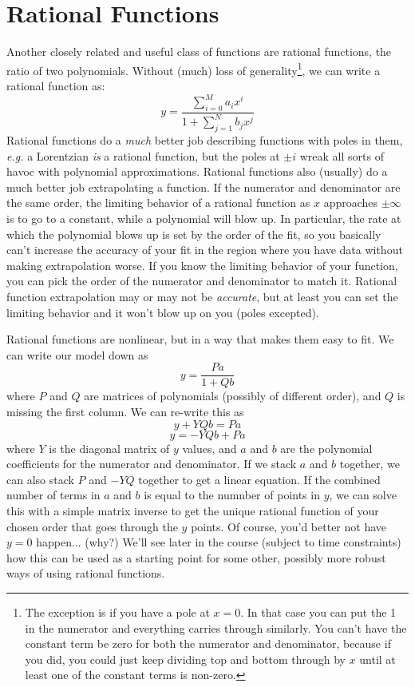 \documentclass[12]{article}
\begin{document}
\section{Rational Functions}
Another closely related and useful class of functions are rational
functions, the ratio of two polynomials.  Without (much) loss of
generality\footnote{The exception is if you have a pole at $x=0$.  In
  that case you can put the 1 in the numerator and everything carries
  through similarly.  You can't have the constant term be zero for
  both the numerator and denominator, because if you did, you could
  just keep dividing top and bottom through by $x$ until at least one
  of the constant terms is non-zero.}, we can write a rational function as:
$$y=\frac{\sum_{i=0}^M a_i x^i}{1+\sum_{j=1}^N b_j x^j}$$
Rational functions do a \textit{much} better job describing functions
with poles in them, \textit{e.g.} a Lorentzian \textit{is} a rational function,
but the poles at $\pm i$ wreak all sorts of havoc with polynomial
approximations.  Rational functions also (usually) do a much better
job extrapolating a function.  If the numerator and denominator are
the same order, the limiting behavior of a rational function as $x$
approaches $\pm \infty$ is to go to a constant, while a polynomial
will blow up.  In particular, the rate at which the polynomial blows
up is set by the order of the fit, so you basically can't increase the
accuracy of your fit in the region where you have data without making
extrapolation worse.  If you know the limiting behavior of your
function, you can pick the order of the numerator and denominator to
match it.  Rational function extrapolation may or may not
be \textit{accurate}, but at least you can set the limiting behavior
and it won't blow up on you (poles excepted).

Rational functions are nonlinear, but in a way that makes them easy to
fit.  We can write our model down as 
$$y=\frac{Pa}{1+Qb}$$
where $P$ and $Q$ are  matrices of polynomials (possibly of different
order), and $Q$ is missing the first column.  We can re-write this as 
$$y+YQb=Pa$$
$$y=-YQb+Pa$$
where $Y$ is the diagonal matrix of $y$ values, and $a$ and $b$ are
the polynomial coefficients for the numerator and denominator. If we
stack $a$ and $b$ together, we can also stack $P$ and $-YQ$ together
to get a linear equation.  If the combined number of terms in $a$ and
$b$ is equal to the numnber of points in $y$, we can solve this with a
simple matrix inverse to get the unique rational function of your
chosen order that goes through the $y$ points.  Of course, you'd
better not have $y=0$ happen... (why?) We'll see later in the course
(subject to time constraints) how this can be used as a starting point
for some other, possibly more robust ways of using rational functions.
\end{document}
